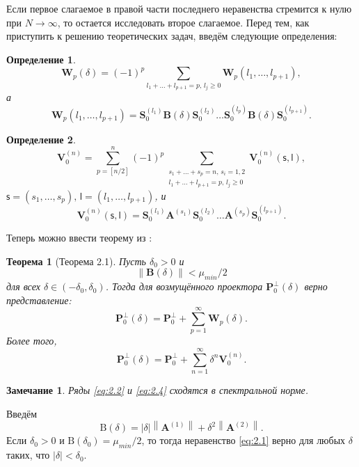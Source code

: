 \documentclass[specialist,
substylefile = spbu_report.rtx,
subf,href,colorlinks=true, 12pt]{disser}
\newcommand\norm[1]{\left\|#1\right\|}
\newtheorem{theorem}{Теорема}
\newtheorem{remark}{Замечание}
\newtheorem{definition}{Определение}
\begin{document}
	Если первое слагаемое в правой части последнего неравенства  стремится к нулю при $N \rightarrow \infty$, то остается исследовать второе слагаемое. Перед тем, как приступить к решению теоретических задач, введём следующие определения:
	\begin{definition}
		\begin{equation}
			\mathbf{W}_p(\delta) = (-1)^p\sum\limits_{l_1+\dots+l_{p+1}=p,\,l_j\geqslant0}\mathbf{W}_p(l_1,\dots,l_{p+1}),\label{eq:w}
		\end{equation}
		а
		\begin{equation*}
			\mathbf{W}_p(l_1,\dots,l_{p+1}) = \mathbf{S}_0^{(l_1)}\mathbf{B}(\delta)\mathbf{S}_0^{(l_2)}\dots\mathbf{S}_0^{(l_p)}\mathbf{B}(\delta)\mathbf{S}_0^{(l_{p+1})}.
		\end{equation*}
	\end{definition}
	\begin{definition}
		\begin{equation*}
			\mathbf{V}_0^{(n)}=\sum\limits_{p=[n/2]}^n(-1)^p\sum_{\substack{
					s_1+\dots+s_p=n,\,s_i=1,2\\
					l_1+\dots+l_{p+1}=p,\,l_j\geqslant0}}
			\mathbf{V}_0^{(n)}(\mathsf{s},\mathsf{l}),
		\end{equation*}
		$\mathsf{s} = (s_1,\dots,s_p),\,\mathsf{l}=(l_1,\dots,l_{p+1})$, и
		\begin{equation*}
			\mathbf{V}_0^{(n)}(\mathsf{s}, \mathsf{l})=\mathbf{S}_0^{(l_1)}\mathbf{A}^{(s_1)}\mathbf{S}_0^{(l_2)}\dots\mathbf{A}^{(s_p)}\mathbf{S}_0^{(l_{p+1})}.
		\end{equation*}
	\end{definition}
	Теперь можно ввести теорему из \cite{Nekrutkin10}:
	\begin{theorem}[Теорема 2.1]\label{th:2.1}\rm
		\emph{Пусть} $\delta_0>0$ и
		\begin{equation}\label{eq:2.1}
			\norm{\mathbf{B}(\delta)}<\mu_{min}/2
		\end{equation}
		\emph{для всех} $\delta\in(-\delta_0,\delta_0)$. \emph{Тогда для возмущённого проектора} $\mathbf{P}_0^\bot(\delta)$ \emph{верно представление:}
		\begin{equation}\label{eq:2.2}
			\mathbf{P}_0^\bot(\delta)=\mathbf{P}_0^\bot + \sum_{p=1}^\infty\mathbf{W}_p(\delta).
		\end{equation}
		\emph{Более того,}
		\begin{equation}\label{eq:2.4}
			\mathbf{P}_0^\bot(\delta) = \mathbf{P}_0^\bot + \sum_{n=1}^\infty\delta^n\mathbf{V}_0^{(n)}.
		\end{equation}
	\end{theorem}
	\begin{remark}
		Ряды	\eqref{eq:2.2} и \eqref{eq:2.4} сходятся в спектральной норме.
	\end{remark}
	Введём
	\begin{equation*}
		\mathrm{B}(\delta) = |\delta|\norm{\mathbf{A}^{(1)}}+\delta^2\norm{\mathbf{A}^{(2)}}.
	\end{equation*}
	Если $\delta_0>0$ и $\mathrm{B}(\delta_0)=\mu_{min}/2$, то тогда неравенство \eqref{eq:2.1} верно для любых $\delta$ таких, что $|\delta|<\delta_0$.
	
\end{document}
